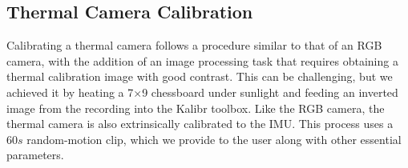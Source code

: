 \documentclass[10pt,twocolumn,letterpaper]{article}
\begin{document}






\subsection{Thermal Camera Calibration} 

Calibrating a thermal camera follows a procedure similar to that of an RGB camera, with the addition of an image processing task that requires obtaining a thermal calibration image with good contrast. This can be challenging, but we achieved it by heating a 7$\times$9 chessboard under sunlight and feeding an inverted image from the recording into the Kalibr toolbox. Like the RGB camera, the thermal camera is also extrinsically calibrated to the IMU. This process uses a $60s$ random-motion clip, which we provide to the user along with other essential parameters.


\end{document}

